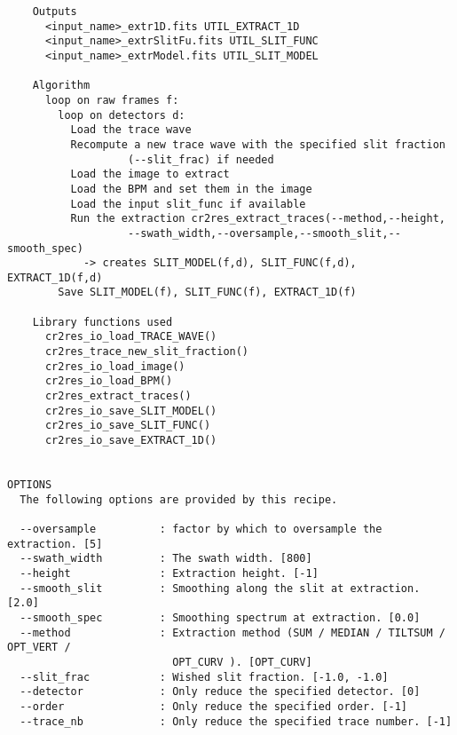 \begin{verbatim}
    Outputs                                                               
      <input_name>_extr1D.fits UTIL_EXTRACT_1D         
      <input_name>_extrSlitFu.fits UTIL_SLIT_FUNC      
      <input_name>_extrModel.fits UTIL_SLIT_MODEL      
                                                                          
    Algorithm                                                             
      loop on raw frames f:                                               
        loop on detectors d:                                              
          Load the trace wave                                             
          Recompute a new trace wave with the specified slit fraction     
                   (--slit_frac) if needed                                
          Load the image to extract                                       
          Load the BPM and set them in the image                          
          Load the input slit_func if available                           
          Run the extraction cr2res_extract_traces(--method,--height,     
                   --swath_width,--oversample,--smooth_slit,--smooth_spec)
            -> creates SLIT_MODEL(f,d), SLIT_FUNC(f,d), EXTRACT_1D(f,d)   
        Save SLIT_MODEL(f), SLIT_FUNC(f), EXTRACT_1D(f)                   
                                                                          
    Library functions used                                                
      cr2res_io_load_TRACE_WAVE()                                         
      cr2res_trace_new_slit_fraction()                                    
      cr2res_io_load_image()                                              
      cr2res_io_load_BPM()                                                
      cr2res_extract_traces()                                             
      cr2res_io_save_SLIT_MODEL()                                         
      cr2res_io_save_SLIT_FUNC()                                          
      cr2res_io_save_EXTRACT_1D()                                         
  

OPTIONS
  The following options are provided by this recipe.

  --oversample          : factor by which to oversample the extraction. [5]
  --swath_width         : The swath width. [800]
  --height              : Extraction height. [-1]
  --smooth_slit         : Smoothing along the slit at extraction. [2.0]
  --smooth_spec         : Smoothing spectrum at extraction. [0.0]
  --method              : Extraction method (SUM / MEDIAN / TILTSUM / OPT_VERT /
                          OPT_CURV ). [OPT_CURV]
  --slit_frac           : Wished slit fraction. [-1.0, -1.0]
  --detector            : Only reduce the specified detector. [0]
  --order               : Only reduce the specified order. [-1]
  --trace_nb            : Only reduce the specified trace number. [-1]

\end{verbatim}

